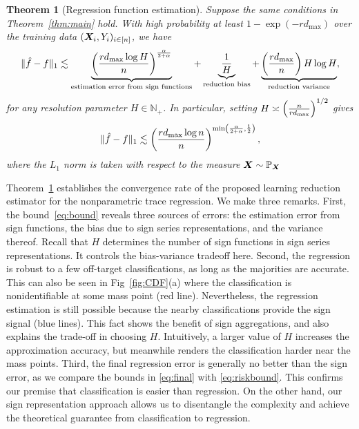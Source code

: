 \documentclass[aos]{imsart}
\newtheorem{theorem}{Theorem}%
\theoremstyle{definition}
\newcommand*{\KeepStyleUnderBrace}[1]{%
\mathop{%
\mathchoice
{\underbrace{\displaystyle#1}}%
{\underbrace{\textstyle#1}}%
{\underbrace{\scriptstyle#1}}%
{\underbrace{\scriptscriptstyle#1}}%
}\limits
}
\begin{document}
\begin{theorem}[Regression function estimation]\label{thm:regression} 
Suppose the same conditions in Theorem~\ref{thm:main} hold. With high probability at least $1-\exp(-rd_{\max})$ over the training data $(\bm X_i,Y_i)_{i\in[n]}$, we have 
\begin{align}\label{eq:bound}
\onenormSize{}{\hat f-f} \lesssim \KeepStyleUnderBrace{\left({rd_{\max}\log H \over n}\right)^{\alpha \over 2+\alpha}}_{\text{estimation error from sign functions}}+\KeepStyleUnderBrace{1\over H}_{\text{reduction bias}}+\KeepStyleUnderBrace{\left({rd_{\max}\over n}\right)H \log H}_{\text{reduction variance}},
\end{align}
for any resolution parameter $H \in \mathbb{N}_{+}$. In particular, setting $H\asymp \left( {n\over rd_{\max}} \right)^{1/2}$ gives 
\begin{equation}\label{eq:final}
\onenormSize{}{\hat f-f} \lesssim \left({rd_{\max} \log n\over n}\right)^{\min\left({\alpha\over 2+\alpha}, {1\over 2}\right)},
\end{equation}
where the $L_1$ norm is taken with respect to the measure $\bm X\sim\mathbb{P}_{\bm X}$
\end{theorem}

\noindent
Theorem~\ref{thm:regression} establishes the convergence rate of the proposed learning reduction estimator for the nonparametric trace regression. We make three remarks. First, the bound~\eqref{eq:bound} reveals three sources of errors: the estimation error from sign functions, the bias due to sign series representations, and the variance thereof. Recall that $H$ determines the number of sign functions in sign series representations. It controls the bias-variance tradeoff here. Second, the regression is robust to a few off-target classifications, as long as the majorities are accurate. This can also be seen in Fig~\ref{fig:CDF}(a) where the classification is nonidentifiable at some mass point (red line). Nevertheless, the regression estimation is still possible because the nearby classifications provide the sign signal (blue lines). This fact shows the benefit of sign aggregations, and also explains the trade-off in choosing $H$. Intuitively, a larger value of $H$ increases the approximation accuracy, but meanwhile renders the classification harder near the mass points. Third, the final regression error is generally no better than the sign error, as we compare the bounds in \eqref{eq:final} with \eqref{eq:riskbound}. This confirms our premise that classification is easier than regression. On the other hand, our sign representation approach allows us to disentangle the complexity and achieve the theoretical guarantee from classification to regression.
\end{document}
